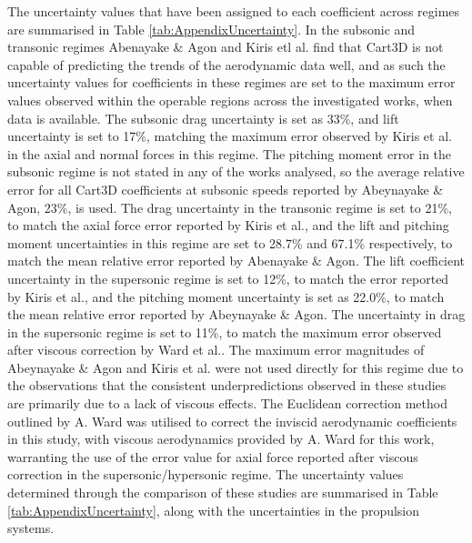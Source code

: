   The uncertainty values that have been assigned to each coefficient across regimes are summarised in Table \ref{tab:AppendixUncertainty}.
  In the subsonic and transonic regimes Abenayake \& Agon and Kiris etl al. find that Cart3D is not capable of predicting the trends of the aerodynamic data well\cite{Abeynayake2013a,Kiris2011}, and as such the uncertainty values for coefficients in these regimes are set to the maximum error values observed within the operable regions across the investigated works, when data is available.
  The subsonic drag uncertainty is set as 33\%, and lift uncertainty is set to 17\%, matching the  maximum error observed by Kiris et al.\cite{Kiris2011} in the axial and normal forces in this regime. 
The pitching moment error in the subsonic regime is not stated in any of the works analysed, so the average relative error for all Cart3D coefficients at subsonic speeds reported by Abeynayake \& Agon\cite{Abeynayake2013a}, 23\%, is used.
The drag uncertainty in the transonic regime is set to 21\%, to match the axial force error reported by Kiris et al.\cite{Kiris2011}, and the lift and pitching moment uncertainties in this regime are set to 28.7\% and 67.1\% respectively, to match the mean relative error reported by Abenayake \& Agon\cite{Abeynayake2013a}. 
The lift coefficient uncertainty in the supersonic regime is set to 12\%, to match the error reported by Kiris et al.\cite{Kiris2011}, and the pitching moment uncertainty is set as 22.0\%, to match the mean relative error reported by Abeynayake \& Agon\cite{Abeynayake2013a}. 
The uncertainty in drag in the supersonic regime is set to 11\%, to match the maximum error observed after viscous correction by Ward et al.\cite{Ward2018}. The maximum error magnitudes of Abeynayake \& Agon\cite{Abeynayake2013a} and Kiris et al.\cite{Kiris2011} were not used directly for this regime due to the observations that the consistent underpredictions observed in these studies are primarily due to a lack of viscous effects. The Euclidean correction method outlined by A. Ward was utilised to correct the inviscid aerodynamic coefficients in this study, with viscous aerodynamics provided by A. Ward for this work, warranting the use of the error value for axial force reported after viscous correction in the supersonic/hypersonic regime. 
The uncertainty values determined through the comparison of these studies are summarised in Table \ref{tab:AppendixUncertainty}, along with the uncertainties in the propulsion systems. 





